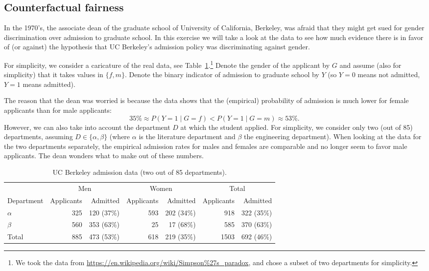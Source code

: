 \subsection{Counterfactual fairness}


In the 1970's, the associate dean of the graduate school of University of California, Berkeley, was afraid that they might get sued for gender discrimination over admission to graduate school.
In this exercise we will take a look at the data to see how much evidence there is in favor of (or against) the hypothesis that UC Berkeley's admission policy was discriminating against gender.

For simplicity, we consider a caricature of the real data, see Table~\ref{tab:Berkeley_admission_data}.\footnote{We took the data from \url{https://en.wikipedia.org/wiki/Simpson\%27s_paradox}, and chose a subset of two departments for simplicity.}
Denote the gender of the applicant by $G$ and assume (also for simplicity) that it takes values in $\{f,m\}$.
Denote the binary indicator of admission to graduate school by $Y$ (so $Y=0$ means not admitted, $Y=1$ means admitted).

The reason that the dean was worried is because the data shows that the (empirical) probability of admission is much lower for female applicants than for male applicants:
$$35\% \approx P(Y=1 \mid G=f) < P(Y=1 \mid G=m) \approx 53\%.$$
However, we can also take into account the department $D$ at which the student applied. 
For simplicity, we consider only two (out of 85) departments, assuming $D \in \{\alpha,\beta\}$ (where $\alpha$ is the literature department and $\beta$ the engineering department).
When looking at the data for the two departments separately, the empirical admission rates for males and females are comparable and no longer seem to favor male applicants.
The dean wonders what to make out of these numbers.


\begin{table}[h!]\begin{tabular}{l|rr|rr|rr}
             & \multicolumn{2}{c|}{Men} & \multicolumn{2}{c|}{Women} & \multicolumn{2}{c}{Total} \\
  Department & Applicants & Admitted &	Applicants & Admitted & Applicants & Admitted \\
  \hline
  $\alpha$ & 325& 120 (37\%) & 593& 202 (34\%) & 918& 322 (35\%) \\ %
  $\beta$  & 560& 353 (63\%) &  25&  17 (68\%) & 585& 370 (63\%) \\ %
  \hline
  Total    & 885& 473 (53\%) & 618& 219 (35\%) &1503& 692 (46\%)
\end{tabular}
\caption{UC Berkeley admission data (two out of 85 departments).\label{tab:Berkeley_admission_data}}
\end{table}

